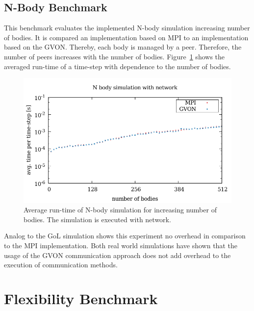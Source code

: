 \subsection{N-Body Benchmark}
This benchmark evaluates the implemented N-body simulation increasing
number of bodies. It is compared an implementation based on MPI to an
implementation based on the GVON.  Thereby, each body is managed by a
peer. Therefore, the number of peers increases with the number of
bodies. Figure~\ref{fig:nbody_laser} shows the averaged run-time of a
time-step with dependence to the number of bodies.

\begin{figure}[H]
  \includegraphics[width=\textwidth]{plots/50_nbody_network_laser}
  \caption{Average run-time of N-body simulation for increasing
    number of bodies. The simulation is executed with network.}
  \label{fig:nbody_laser}
\end{figure}

\noindent Analog to the GoL simulation shows this experiment no
overhead in comparison to the MPI implementation. Both real world
simulations have shown that the usage of the GVON communication
approach does not add overhead to the execution of communication
methods.

\section{Flexibility Benchmark}

